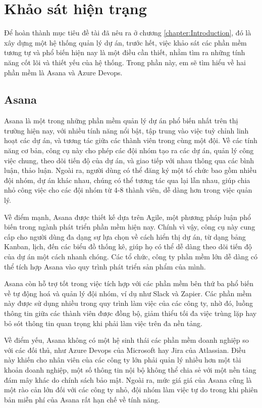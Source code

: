 \documentclass[../DoAn.tex]{subfiles}
\begin{document}
\section{Khảo sát hiện trạng}
\label{section:2.1}
Để hoàn thành mục tiêu đề tài đã nêu ra ở chương \ref{chapter:Introduction}, đó là xây dựng một hệ thống quản lý dự án, trước hết, việc khảo sát các phần mềm tương tự và
phổ biến hiện nay là một điều cần thiết, nhằm tìm ra những tính năng cốt lõi và thiết yếu của hệ thống. Trong phần này, em sẽ tìm hiểu về hai phần mềm là Asana và Azure Devops.

\label{subsection:2.1.1}
\subsection{Asana}
Asana là một trong những phần mềm quản lý dự án phổ biến nhất trên thị trường hiện nay, với nhiều tính năng nổi bật, tập trung vào việc tuỳ chỉnh linh hoạt các dự án, và tương tác giữa các thành viên trong cùng một đội. Về các tính năng cơ bản, công cụ này cho phép các đội nhóm tạo ra các dự án,
quản lý công việc chung, theo dõi tiến độ của dự án, và giao tiếp với nhau thông qua các bình luận, thảo luận. Ngoài ra, người dùng có thể đăng ký một tổ chức bao gồm nhiều
đội nhóm, dự án khác nhau, chúng có thể tương tác qua lại lẫn nhau, giúp chia nhỏ công việc cho các đội nhóm từ 4-8 thành viên, dễ dàng hơn trong việc quản lý.

Về điểm mạnh, Asana được thiết kế dựa trên Agile, một phương pháp luận phổ biến trong ngành phát triển phần mềm hiện nay. Chính vì vậy, công cụ này cung cấp cho người dùng
đa dạng sự lựa chọn về cách hiển thị dự án, từ dạng bảng Kanban, lịch, đến các biểu đồ thống kê, giúp họ có thể dễ dàng theo dõi tiến độ của dự án một cách nhanh chóng.
Các tổ chức, công ty phần mềm lớn dễ dàng có thể tích hợp Asana vào quy trình phát triển sản phẩm của mình.

Asana còn hỗ trợ tốt trong việc tích hợp với các phần mềm bên thứ ba phổ biến về tự động hoá và quản lý đội nhóm, ví dụ như Slack và Zapier. Các phần mềm này được sử dụng nhiều
trong quy trình làm việc của các công ty, nhờ đó, luồng thông tin giữa các thành viên được đồng bộ, giảm thiểu tối đa việc trùng lặp hay bỏ sót thông tin quan trọng khi phải
làm việc trên đa nền tảng.

Về điểm yếu, Asana không có một hệ sinh thái các phần mềm doanh nghiệp so với các đối thủ, như Azure Devops của Microsoft hay Jira của Atlassian.
Điều này khiến cho nhân viên của các công ty lớn phải quản lý nhiều hơn một tài khoản doanh nghiệp, một số thông tin nội bộ không thể chia sẻ với một nền tảng đám mây khác
do chính sách bảo mật. Ngoài ra, mức giá giá của Asana cũng là một rào cản lớn đối với các công ty nhỏ, đội nhóm làm việc tự do trong khi phiên bản miễn phí của Asana rất
hạn chế về tính năng.
\end{document}
